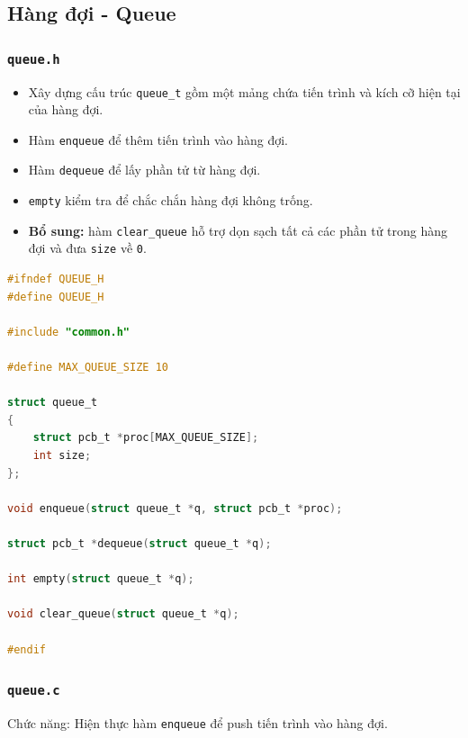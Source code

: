\subsection{Hàng đợi - Queue}

\subsubsection{\texttt{queue.h}}
\begin{itemize}
   \item Xây dựng cấu trúc \colorbox{gray!10}{\texttt{queue\_t}} gồm một mảng chứa tiến trình và kích cỡ hiện tại của hàng đợi.
    \item Hàm \colorbox{gray!10}{\texttt{enqueue}} để thêm tiến trình vào hàng đợi.
    \item Hàm \colorbox{gray!10}{\texttt{dequeue}} để lấy phần tử từ hàng đợi.
    \item \colorbox{gray!10}{\texttt{empty}} kiểm tra để chắc chắn hàng đợi không trống.
    \item \textbf{Bổ sung:} hàm \colorbox{gray!10}{\texttt{clear\_queue}} hỗ trợ dọn sạch tất cả các phần tử trong hàng đợi và đưa \texttt{size} về \texttt{0}.

\end{itemize}

\begin{lstlisting}[style=Cstyle,language=C]
#ifndef QUEUE_H
#define QUEUE_H

#include "common.h"

#define MAX_QUEUE_SIZE 10

struct queue_t
{
	struct pcb_t *proc[MAX_QUEUE_SIZE];
	int size;
};

void enqueue(struct queue_t *q, struct pcb_t *proc);

struct pcb_t *dequeue(struct queue_t *q);

int empty(struct queue_t *q);

void clear_queue(struct queue_t *q);

#endif
\end{lstlisting}



\subsubsection{\texttt{queue.c}}


Chức năng: Hiện thực hàm \colorbox{gray!10}{\texttt{enqueue}} để push tiến trình vào hàng đợi.

